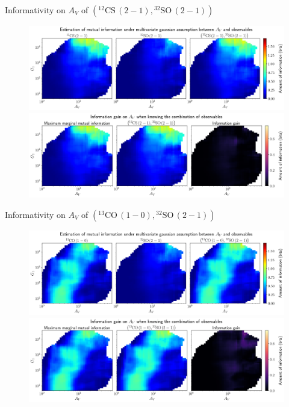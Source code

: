 \documentclass{beamer}
\begin{document}
\begin{frame}{Informativity on $A_V$ of $\left(\mathrm{^{12}CS\,(2-1)},\mathrm{^{32}SO\,(2-1)}\right)$}
    \begin{figure}
        \centering
        \includegraphics[width=0.95\linewidth]{../linearinfogauss/av__12cs21_32so21_linearinfogauss.png}
        \vfill
        \includegraphics[width=0.95\linewidth]{../linearinfogauss/av__12cs21_32so21_linearinfogauss_gain.png}
    \end{figure}
\end{frame}

\begin{frame}{Informativity on $A_V$ of $\left(\mathrm{^{13}CO\,(1-0)},\mathrm{^{32}SO\,(2-1)}\right)$}
    \begin{figure}
        \centering
        \includegraphics[width=0.95\linewidth]{../linearinfogauss/av__13co10_32so21_linearinfogauss.png}
        \vfill
        \includegraphics[width=0.95\linewidth]{../linearinfogauss/av__13co10_32so21_linearinfogauss_gain.png}
    \end{figure}
\end{frame}
\end{document}
